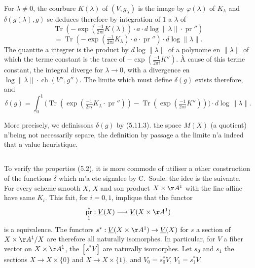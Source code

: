 \documentclass[12pt,a4paper]{article}
\theoremstyle{plain}
\theoremstyle{definition}
\DeclareMathOperator{\Tr}{Tr}
\DeclareMathOperator{\ch}{ch}
\DeclareMathOperator{\pr}{pr}
\begin{document}
For $\lambda \neq 0$, the courbure $K(\lambda)$ of $(V, g_\lambda)$ is the image by $\varphi(\lambda)$ of
$K_\lambda$ and $\delta(g(\lambda), g)$ se deduces therefore by integration of $1$ a $\lambda$ of
\[
\Tr(-\exp(\tfrac{-1}{2\pi i} K(\lambda)) \cdot a \cdot d\log \|\lambda\| \cdot \pr'')
\]
\[
= \Tr(-\exp(\tfrac{-1}{2\pi i} K_\lambda) \cdot a \cdot \pr'') \cdot d\log \|\lambda\| .
\]
The quantite a integrer is the product by $d\log \|\lambda\|$ of a polynome en $\|\lambda\|$
of which the terme constant is the trace of $-\exp(\frac{-1}{2\pi i} K'')$. \`A cause of this terme constant,
the integral diverge for $\lambda \to 0$, with a divergence en $\log \|\lambda\| \cdot \ch(V'', g'')$.
The limite which must define $\delta(g)$ exists therefore, and
\begin{equation}\label{eq:5.11.3}
\delta(g) = \int_0^1 \bigl(\Tr(\exp(\tfrac{-1}{2\pi i} K_\lambda \cdot \pr'')) - \Tr(\exp(\tfrac{-1}{2\pi i} K''))\bigr) \cdot d\log \|\lambda\| .
\end{equation}

More precisely, we definissons $\delta(g)$ by (5.11.3). the space $M(X)$
(a quotient) n'being not necessarily separe, the definition by passage a the
limite n'a indeed that a value heuristique.

\subsection{}

To verify the properties (5.2), it is more commode of utiliser a other
construction of the functions $\delta$ which m'a ete signalee by C.~Soule. the idee is
the suivante. For every scheme smooth $X$, $X$ and son product $X \times \AA^1$ with the line
affine have same $K_i$. This fait, for $i = 0, 1$, implique that the functor
\[
\pr_1^*: \underline{V}(X) \longrightarrow \underline{V}(X \times \AA^1)
\]
is a equivalence. The functors $s^*: \underline{V}(X \times \AA^1) \to \underline{V}(X)$ for $s$ a section
of $X \times \AA^1/X$ are therefore all naturally isomorphes. In particular, for
$V$ a fiber vector on $X \times \AA^1$, the $[s^* V]$ are naturally isomorphes.
Let $s_0$ and $s_1$ the sections $X \to X \times \{0\}$ and $X \to X \times \{1\}$, and $V_0 = s_0^* V$,
$V_1 = s_1^* V$.
\end{document}
